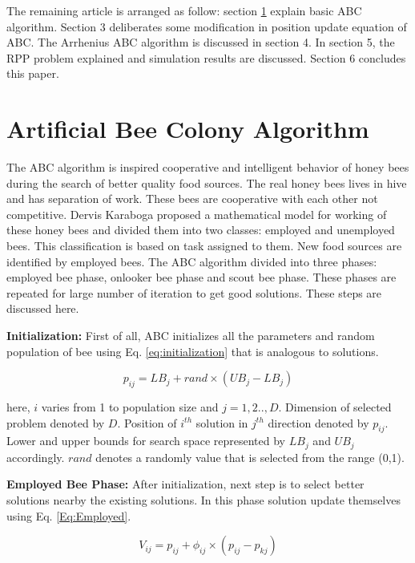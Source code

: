 \documentclass{svproc}
\begin{document}
The remaining article is arranged as follow: section \ref{sec:abc} explain basic ABC algorithm. Section 3 deliberates some modification in position update equation of ABC. The Arrhenius ABC algorithm is discussed in section 4. In section 5, the RPP problem explained and simulation results are discussed. Section 6 concludes this paper.

\section{Artificial Bee Colony Algorithm}\label{sec:abc}
The ABC algorithm is inspired cooperative and intelligent behavior of honey bees during the search of better quality food sources. The real honey bees lives in hive and has separation of work. These bees are cooperative with each other not competitive. Dervis Karaboga \cite{karaboga2005idea} proposed a mathematical model for working of these honey bees and divided them into two classes: employed and unemployed bees. This classification is based on task assigned to them. New food sources are identified by employed bees.
The ABC algorithm divided into three phases: employed bee phase, onlooker bee phase and scout bee phase. These phases are repeated for large number of iteration to get good solutions. These steps are discussed here.

\textbf{Initialization:} First of all, ABC initializes all the parameters and random population of bee using Eq. \ref{eq:initialization} that is analogous to solutions.

\begin{equation}\label{eq:initialization}
p_{ij}= LB_{j}+rand\times{(UB_{j}-LB_{j})}
\end{equation}

here, $i$ varies from 1 to population size and $j=1,2..,D$. Dimension of selected problem denoted by $D$. Position of $i^{th}$ solution in $j^{th}$ direction denoted by $p_{ij}$. Lower and upper bounds for search space represented by $LB_j$ and $UB_j$ accordingly. $rand$ denotes a randomly value that is selected from the range (0,1).

\textbf{Employed Bee Phase:} After initialization, next step is to select better solutions nearby the existing solutions. In this phase solution update themselves using Eq. \ref{Eq:Employed}.

\begin{equation}\label{Eq:Employed}
  V_{ij}=p_{ij}+\phi_{ij}\times(p_{ij}-p_{kj})
\end{equation}
\end{document}
